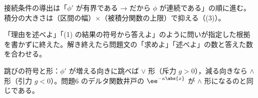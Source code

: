\item 接続条件の導出は「$\phi'$ が有界である → だから $\phi$ が連続である」の順に進む。積分の大きさは（区間の幅）$\times$（被積分関数の上限）で抑える（(3)）。
\item {} 「理由を述べよ」「(1) の結果の符号から答えよ」のように問いが指定した根拠を書かずに終えた。解き終えたら問題文の「求めよ」「述べよ」の数と答えた数を合わせる。
\item 跳びの符号と形：$\phi'$ が増える向きに跳べば $\vee$ 形（斥力 $g>0$），減る向きなら $\wedge$ 形（引力 $g<0$）。問題6 のデルタ関数井戸の $\ee^{-\kappa\abs{x}}$ が $\wedge$ 形になるのと同じである。
